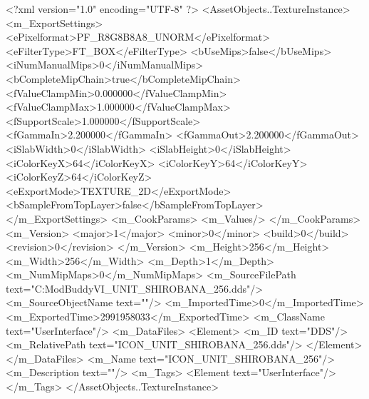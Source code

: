 <?xml version="1.0" encoding="UTF-8" ?>
<AssetObjects..TextureInstance>
	<m_ExportSettings>
		<ePixelformat>PF_R8G8B8A8_UNORM</ePixelformat>
		<eFilterType>FT_BOX</eFilterType>
		<bUseMips>false</bUseMips>
		<iNumManualMips>0</iNumManualMips>
		<bCompleteMipChain>true</bCompleteMipChain>
		<fValueClampMin>0.000000</fValueClampMin>
		<fValueClampMax>1.000000</fValueClampMax>
		<fSupportScale>1.000000</fSupportScale>
		<fGammaIn>2.200000</fGammaIn>
		<fGammaOut>2.200000</fGammaOut>
		<iSlabWidth>0</iSlabWidth>
		<iSlabHeight>0</iSlabHeight>
		<iColorKeyX>64</iColorKeyX>
		<iColorKeyY>64</iColorKeyY>
		<iColorKeyZ>64</iColorKeyZ>
		<eExportMode>TEXTURE_2D</eExportMode>
		<bSampleFromTopLayer>false</bSampleFromTopLayer>
	</m_ExportSettings>
	<m_CookParams>
		<m_Values/>
	</m_CookParams>
	<m_Version>
		<major>1</major>
		<minor>0</minor>
		<build>0</build>
		<revision>0</revision>
	</m_Version>
	<m_Height>256</m_Height>
	<m_Width>256</m_Width>
	<m_Depth>1</m_Depth>
	<m_NumMipMaps>0</m_NumMipMaps>
	<m_SourceFilePath text="C:\Users\asus\Documents\Firaxis ModBuddy\Civilization VI\temppic\ICON_UNIT_SHIROBANA_256.dds"/>
	<m_SourceObjectName text=""/>
	<m_ImportedTime>0</m_ImportedTime>
	<m_ExportedTime>2991958033</m_ExportedTime>
	<m_ClassName text="UserInterface"/>
	<m_DataFiles>
		<Element>
			<m_ID text="DDS"/>
			<m_RelativePath text="ICON_UNIT_SHIROBANA_256.dds"/>
		</Element>
	</m_DataFiles>
	<m_Name text="ICON_UNIT_SHIROBANA_256"/>
	<m_Description text=""/>
	<m_Tags>
		<Element text="UserInterface"/>
	</m_Tags>
</AssetObjects..TextureInstance>

